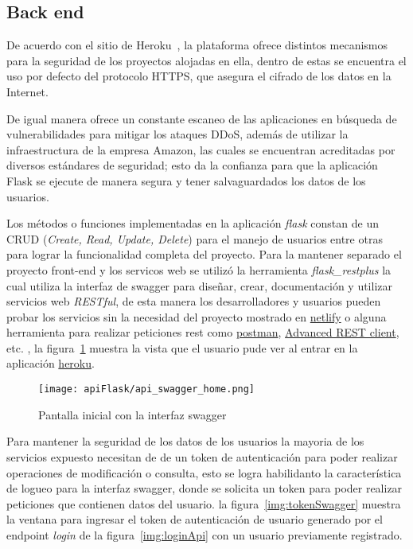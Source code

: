 \subsection*{Back end}


De acuerdo con el sitio de Heroku~\cite{heroku_heroku_2020}, la plataforma ofrece distintos mecanismos para la seguridad de los proyectos alojadas en ella, dentro de estas se encuentra el uso por defecto del protocolo HTTPS, que asegura el cifrado de los datos en la Internet.


De igual manera ofrece un constante escaneo de las aplicaciones en búsqueda de vulnerabilidades para mitigar los ataques DDoS, además de utilizar la infraestructura de la empresa Amazon, las cuales se encuentran acreditadas por diversos estándares de seguridad; esto da la confianza para que la aplicación Flask se ejecute de manera segura y tener salvaguardados los datos de los usuarios.


Los métodos o funciones implementadas en la aplicación \textit{flask} constan de un CRUD (\textit{Create, Read, Update, Delete}) para el manejo de usuarios entre otras para lograr la funcionalidad completa del proyecto. Para la mantener separado el proyecto front-end y los servicos web se utilizó  la herramienta \textit{flask\_restplus} la cual utiliza la interfaz de swagger para diseñar, crear, documentación y utilizar servicios web \textit{RESTful}, de esta manera los desarrolladores y usuarios pueden probar los servicios sin la necesidad del proyecto mostrado en \href{https://serene-haibt-2239b4.netlify.app}{netlify} o alguna herramienta para realizar peticiones rest como \href{https://www.postman.com/downloads/}{postman}, \href{https://install.advancedrestclient.com/install}{Advanced REST client}, etc. , la figura~\ref{img:swaggerApi} muestra la vista que el usuario pude ver al entrar en la aplicación \href{https://api-tt-2019-b052.herokuapp.com}{heroku}.

\begin{figure}[H]
  \centering
  \texttt{[image: apiFlask/api\_swagger\_home.png]}
  \caption{Pantalla inicial con la interfaz swagger}
  \label{img:swaggerApi}
\end{figure}


Para mantener la seguridad de los datos de los usuarios la mayoria de los servicios expuesto necesitan de de un token de autenticación para poder realizar operaciones de modificación o consulta, esto se logra habilidanto la característica de logueo para la interfaz swagger, donde se solicita un token para poder realizar peticiones que contienen datos del usuario. la figura~\ref{img:tokenSwagger} muestra la ventana para ingresar el token de autenticación de usuario generado por el endpoint \textit{login} de la figura~\ref{img:loginApi} con un usuario previamente registrado.

